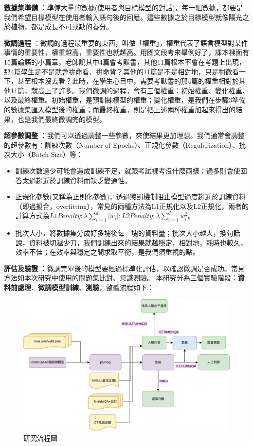 \documentclass[8pt,a4paper,MingLiU,UTF8]{article}
\def\xeCJKembold{0.4}
\def\saveCJKnode{\dimen255\lastkern}
\def\restoreCJKnode{\kern-\dimen255\kern\dimen255}
\let\CJKoldsymbol\CJKsymbol
\let\CJKoldpunctsymbol\CJKpunctsymbol
\def\CJKfakeboldsymbol#1{%
	\special{pdf:literal direct 2 Tr \xeCJKembold\space w}%
	\CJKoldsymbol{#1}%
	\saveCJKnode
	\special{pdf:literal direct 0 Tr}%
	\restoreCJKnode}
\def\CJKfakeboldpunctsymbol#1{%
	\special{pdf:literal direct 2 Tr \xeCJKembold\space w}%
	\CJKoldpunctsymbol{#1}%
	\saveCJKnode
	\special{pdf:literal direct 0 Tr}%
	\restoreCJKnode}
\newcommand\CJKfakebold[1]{%
	\let\CJKsymbol\CJKfakeboldsymbol
	\let\CJKpunctsymbol\CJKfakeboldpunctsymbol
	#1%
	\let\CJKsymbol\CJKoldsymbol
	\let\CJKpunctsymbol\CJKoldpunctsymbol}
\begin{document}
	\CJKfakebold{\textbf{數據集準備}}：準備大量的數據(使用者與目標模型的對話)，每一組數據，都要是我們希望目標模型在使用者輸入語句後的回應。這些數據之於目標模型就像陽光之於植物，都是成長不可或缺的養分。
	
	\CJKfakebold{\textbf{微調過程}}：微調的過程最重要的東西，叫做「權重」，權重代表了語言模型對某件事情的重要性，權重越高，重要性也就越高。用國文段考來舉例好了，課本裡面有15篇論語的小篇章，老師說其中4篇會考默書，其他11篇根本不會在考題上出現，那4篇學生是不是就會拚命看、拚命背？其他的11篇是不是相對地，只是稍微看一下，甚至根本沒去看？此時，在學生心目中，需要考默書的那4篇的權重相對於其他11篇，就高上了許多。我們微調的過程，會有三個權重：初始權重、變化權重、以及最終權重。初始權重，是預訓練模型的權重；變化權重，是我們在步驟3準備的數據集匯入模型後的權重；而最終權重，則是把上述兩種權重加起來得出的結果，也是我們最終微調完的模型。
	
	\CJKfakebold{\textbf{超參數調整}}：我們可以透過調整一些參數，來使結果更加理想。我們通常會調整的超參數有：訓練次數（Number of Epochs）、正規化參數（Regularization）、批次大小（Batch Size）等：
	\begin{itemize}
		\item 訓練次數過少可能會造成訓練不足，就跟考試裸考沒什麼兩樣；過多則會使回答太過趨近於訓練資料而缺乏變通性。
		\item 正規化參數(又稱為正則化參數)，透過懲罰機制阻止模型過度趨近於訓練資料（即過擬合，overfitting），常見的兩種方法為L1正規化以及L2正規化，兩者的計算方式為$L1 Penalty:\lambda\sum_{i=1}^{d}|w_i|;L2 Penalty:\lambda\sum_{i=1}^{d}w^2_i$。
		\item 批次大小，將數據集分成好多塊後每一塊的資料量；批次大小越大，換句話說，資料被切越少刀，我們訓練出來的結果就越穩定，相對地，耗時也較久，效率不佳；在效率與穩定之間求取平衡，是我們須重視的點。
	\end{itemize}
	
	\CJKfakebold{\textbf{評估及驗證}}：微調完畢後的模型要經過標準化評估，以確認微調是否成功。常見方法如本次研究中使用的問題集比對、意識測驗。
	本研究分為三個實驗階段：\textbf{資料前處理}、\textbf{微調模型訓練}、\textbf{測驗}，整體流程如下：
	
	\begin{figure}[H]
		\centering
	\includegraphics[width=\textwidth]{flowofstudy}
	\caption{研究流程圖}
	\end{figure}
	
\end{document}
